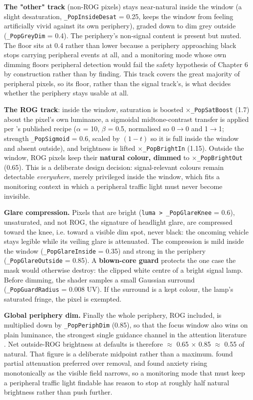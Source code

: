 \textbf{The "other" track} (non-ROG pixels) stays near-natural inside the window (a slight desaturation,
\verb|_PopInsideDesat| = 0.25, keeps the window from feeling artificially vivid against its own
periphery), graded down to dim grey outside (\verb|_PopGreyDim| = 0.4). The periphery's non-signal
content is present but muted. The floor sits at 0.4 rather than lower because a periphery approaching
black stops carrying peripheral events at all, and a monitoring mode whose own dimming floors
peripheral detection would fail the safety hypothesis of Chapter 6 by construction rather than by
finding. This track covers the great majority of peripheral pixels, so its floor, rather than the
signal track's, is what decides whether the periphery stays usable at all.

\textbf{The ROG track}: inside the window, saturation is boosted $\times$\verb|_PopSatBoost| (1.7) about the pixel's
own luminance, a sigmoidal midtone-contrast transfer is applied per \citet{sutton2022}'s published recipe
($\alpha$ = 10, $\beta$ = 0.5, normalised so 0$\rightarrow$0 and 1$\rightarrow$1; strength \verb|_PopSigmoid| = 0.6, scaled by $(1-t)$ so it is
full inside the window and absent outside), and brightness is lifted $\times$\verb|_PopBrightIn| (1.15).
Outside the window, ROG pixels keep their \textbf{natural colour, dimmed} to $\times$\verb|_PopBrightOut| (0.65).
This is a deliberate design decision: signal-relevant colours remain detectable \textit{everywhere}, merely
privileged inside the window, which fits a monitoring context in which a peripheral traffic light
must never become invisible.

\textbf{Glare compression.} Pixels that are bright (\verb|luma > _PopGlareKnee| = 0.6), unsaturated, and not
ROG, the signature of headlight glare, are compressed toward the knee, i.e. toward a visible dim
spot, never black: the oncoming vehicle stays legible while its veiling glare is attenuated. The
compression is mild inside the window (\verb|_PopGlareInside| = 0.35) and strong in the periphery
(\verb|_PopGlareOutside| = 0.85). A \textbf{blown-core guard} protects the one case the mask would otherwise
destroy: the clipped white centre of a bright signal lamp. Before dimming, the shader samples a small
Gaussian surround (\verb|_PopGuardRadius| = 0.008 UV). If the surround is a kept colour, the lamp's
saturated fringe, the pixel is exempted.

\textbf{Global periphery dim.} Finally the whole periphery, ROG included, is multiplied down by
\verb|_PopPeriphDim| (0.85), so that the focus window also wins on plain luminance, the strongest single
guidance channel in the attention literature \citep{bailey2009,grogorick2017}. Net
outside-ROG brightness at defaults is therefore $\approx$ 0.65 $\times$ 0.85 $\approx$ 0.55 of natural.
That figure is a deliberate midpoint rather than a maximum. \citet{cheng2022} found partial
attenuation preferred over removal, and \citet{barhorstcates2016} found anxiety
rising monotonically as the visible field narrows, so a monitoring mode that must keep a peripheral
traffic light findable has reason to stop at roughly half natural brightness rather than push
further.

